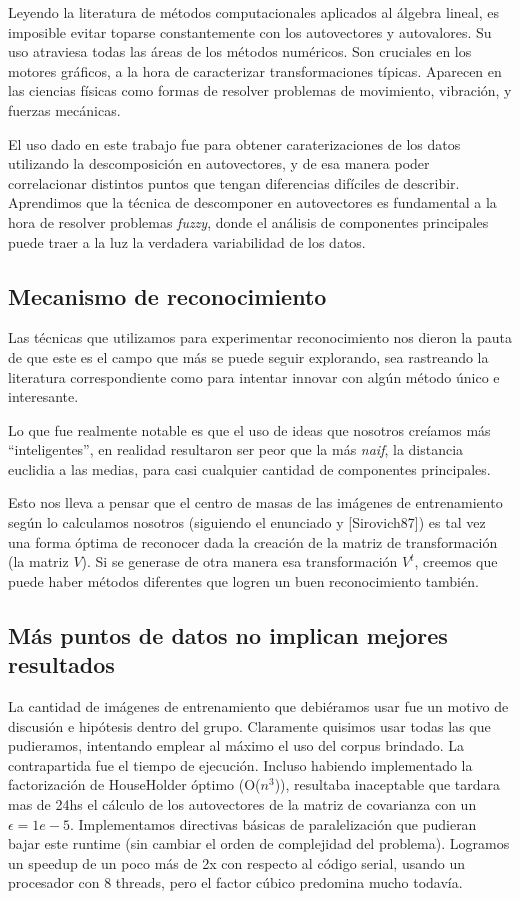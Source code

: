Leyendo la literatura de m\'etodos computacionales aplicados al \'algebra lineal, es
imposible evitar toparse constantemente con los autovectores y autovalores. Su
uso atraviesa todas las \'areas de los m\'etodos num\'ericos. Son cruciales
en los motores gr\'aficos, a la hora de caracterizar transformaciones t\'ipicas.
Aparecen en las ciencias f\'isicas como formas de resolver problemas de movimiento,
vibraci\'on, y fuerzas mec\'anicas.

El uso dado en este trabajo fue para obtener caraterizaciones de los datos utilizando la
descomposici\'on en autovectores, y de esa manera poder correlacionar distintos puntos que
tengan diferencias dif\'iciles de describir. Aprendimos que la t\'ecnica de descomponer en autovectores
es fundamental a la hora de resolver problemas \textit{fuzzy}, donde
el an\'alisis de componentes principales puede traer a la luz la verdadera variabilidad de los datos.


\subsection{Mecanismo de reconocimiento}

Las t\'ecnicas que utilizamos para experimentar reconocimiento nos dieron
la pauta de que este es el campo que m\'as se puede seguir explorando, sea rastreando la literatura
correspondiente como para intentar innovar con alg\'un m\'etodo \'unico e interesante.

Lo que fue realmente notable es que el uso de ideas que nosotros cre\'iamos m\'as ``inteligentes'',
en realidad resultaron ser peor que la m\'as \textit{naif}, la distancia euclidia a las medias, para
casi cualquier cantidad de componentes principales.

Esto nos lleva a pensar que el centro de masas de las im\'agenes de entrenamiento seg\'un lo calculamos
nosotros (siguiendo el enunciado y [Sirovich87]) es tal vez una forma \'optima de reconocer
dada la creaci\'on de la matriz de transformaci\'on (la matriz $V$). Si se generase de otra manera esa
transformaci\'on $V^t$, creemos que puede haber m\'etodos diferentes que logren un buen reconocimiento tambi\'en.


\subsection{M\'as puntos de datos no implican mejores resultados}

La cantidad de im\'agenes de entrenamiento que debi\'eramos usar fue un motivo de
discusi\'on e hip\'otesis dentro del grupo.
Claramente quisimos usar todas las que pudieramos, intentando emplear al m\'aximo el
uso del corpus brindado. La contrapartida fue el tiempo de ejecuci\'on. Incluso habiendo implementado
la factorizaci\'on de HouseHolder \'optimo (O($n^3$)), resultaba inaceptable que tardara mas de 24hs
el c\'alculo de los autovectores de la matriz de covarianza con un $\epsilon = 1e-5$. Implementamos 
directivas b\'asicas de paralelizaci\'on que pudieran bajar este runtime (sin cambiar el orden de complejidad del problema).
Logramos un speedup de un poco m\'as de 2x con respecto al c\'odigo serial, usando
un procesador con 8 threads, pero el factor c\'ubico predomina mucho todav\'ia.


